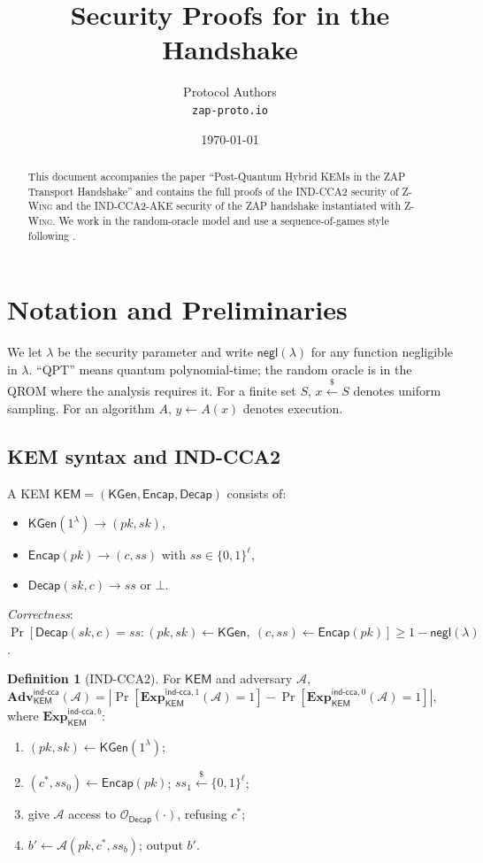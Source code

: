 \documentclass[11pt,a4paper]{article}
\title{Security Proofs for \zwing{} in the \zap{} Handshake}
\author{\zap{} Protocol Authors\\\texttt{zap-proto.io}}
\date{\today}
\theoremstyle{definition}
\newtheorem{definition}[theorem]{Definition}
\theoremstyle{remark}
\newcommand{\KEM}{\ensuremath{\mathsf{KEM}}}
\newcommand{\KGen}{\ensuremath{\mathsf{KGen}}}
\newcommand{\Encap}{\ensuremath{\mathsf{Encap}}}
\newcommand{\Decap}{\ensuremath{\mathsf{Decap}}}
\newcommand{\Adv}{\ensuremath{\mathbf{Adv}}}
\providecommand{\Exp}{}\renewcommand{\Exp}{\ensuremath{\mathbf{Exp}}}
\newcommand{\negl}{\ensuremath{\mathsf{negl}}}
\newcommand{\zwing}{\textsc{Z-Wing}}
\newcommand{\zap}{\textsc{ZAP}}
\newcommand{\BB}{\ensuremath{\{0,1\}}}
\begin{document}
\maketitle

\begin{abstract}
This document accompanies the paper ``Post-Quantum Hybrid KEMs in the
\zap{} Transport Handshake'' and contains the full proofs of the IND-CCA2
security of \zwing{} and the IND-CCA2-AKE security of the \zap{} handshake
instantiated with \zwing{}. We work in the random-oracle model and use a
sequence-of-games style following \cite{shoup2004games}.
\end{abstract}

\tableofcontents

\section{Notation and Preliminaries}\label{sec:notation}

We let $\lambda$ be the security parameter and write $\negl(\lambda)$
for any function negligible in $\lambda$. ``QPT'' means quantum
polynomial-time; the random oracle is in the QROM where the analysis
requires it. For a finite set $S$, $x \xleftarrow{\$} S$ denotes uniform
sampling. For an algorithm $A$, $y \gets A(x)$ denotes execution.

\subsection{KEM syntax and IND-CCA2}

A KEM $\KEM = (\KGen, \Encap, \Decap)$ consists of:
\begin{itemize}
\item $\KGen(1^\lambda) \to (pk, sk)$,
\item $\Encap(pk) \to (c, ss)$ with $ss \in \BB^{\ell}$,
\item $\Decap(sk, c) \to ss$ or $\bot$.
\end{itemize}
\emph{Correctness}: $\Pr[\Decap(sk, c) = ss : (pk, sk) \gets \KGen,\ (c, ss) \gets \Encap(pk)] \ge 1 - \negl(\lambda)$.

\begin{definition}[IND-CCA2]\label{def:indcca}
For $\KEM$ and adversary $\mathcal{A}$,
$\Adv^{\mathsf{ind\text{-}cca}}_{\KEM}(\mathcal{A}) =
 |\Pr[\Exp^{\mathsf{ind\text{-}cca}, 1}_\KEM(\mathcal{A}) = 1]
 - \Pr[\Exp^{\mathsf{ind\text{-}cca}, 0}_\KEM(\mathcal{A}) = 1]|$,
where $\Exp^{\mathsf{ind\text{-}cca}, b}_\KEM$:
\begin{enumerate}
\item $(pk, sk) \gets \KGen(1^\lambda)$;
\item $(c^*, ss_0) \gets \Encap(pk)$; $ss_1 \xleftarrow{\$} \BB^\ell$;
\item give $\mathcal{A}$ access to $\mathcal{O}_{\Decap}(\cdot)$, refusing $c^*$;
\item $b' \gets \mathcal{A}(pk, c^*, ss_b)$; output $b'$.
\end{enumerate}
\end{definition}
\end{document}

